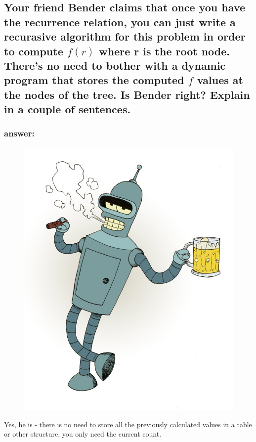 \documentclass[titlepage]{article}
\theoremstyle{definition}
\begin{document}
  \subsection{Your friend Bender claims that once you have the recurrence
    relation, you can just write a recurasive algorithm for this problem in
    order to compute $f(r)$ where r is the root node. There's no need to bother
    with a dynamic program that stores the computed $f$ values at the nodes of
    the tree. Is Bender right? Explain in a couple of sentences.}
      \subsubsection{answer:}
        \begin{figure}
          \centering
            \includegraphics[scale=0.3]{bender}
        \end{figure}
        Yes, he is - there is no need to store all the previously calculated values in
        a table or other structure, you only need the current count. 
\end{document}
